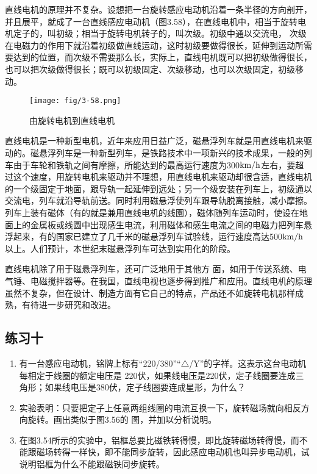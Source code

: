 直线电机的原理并不复杂。设想把一台旋转感应电动机沿着一条半径的方向剖开，并且展平，就成了一台直线感应电动机（图3.58），在直线电机中，相当于旋转电机定子的，叫初级；相当于旋转电机转子的，叫次级。初级中通以交流电，
次级在电磁力的作用下就沿着初级做直线运动，这时初级要做得很长，延伸到运动所需要达到的位置，而次级不需要那么长，实际上，直线电机既可以把初级做得很长，也可以把次级做得很长；既可以初级固定、次级移动，也可以次级固定，初级移动。
\begin{figure}[htp]\centering
\texttt{[image: fig/3-58.png]}
\caption{由旋转电机到直线电机}
\end{figure}

直线电机是一种新型电机，近年来应用日益广泛，磁悬浮列车就是用直线电机来驱动的。磁悬浮列车是一种新型列车，是铁路技术中一项新兴的技术成果，一般的列车由于车轮和铁轨之间有摩擦，所能达到的最高运行速度为300$\text{km}/\text{h}$左右，要超过这个速度，用旋转电机来驱动并不理想，用直线电机来驱动却很含适，直线电机的一个级固定于地面，跟导轨一起延伸到远处；另一个级安装在列车上，初级通以交流电，列车就沿导轨前送。同时利用磁悬浮使列车跟导轨脱离接触，减小摩擦。列车上装有磁体（有的就是兼用直线电机的线園），磁体随列车运动时，使设在地面上的金属板或线圆中出现感生电流，利用磁体和感生电流之间的电磁力把列车悬浮起来，有的国家已建立了几千米的磁悬浮列车试验线，运行速度高达500$\text{km}/\text{h}$以上。人们预计，本世纪末磁悬浮列车可达到实用化的阶段。

直线电机除了用于磁悬浮列车，还可广泛地用于其他方
面，如用于传送系统、电气锤、电磁搅拌器等。在我国，直线电视也逐步得到推广和应用。直线电机的原理虽然不复杂，但在设计、制造方面有它自己的特点，产品还不如旋转电机那样成熟，有待进一步研究和改进。

\subsection*{练习十}
\begin{enumerate}
    \item 有一台感应电动机，铭牌上标有“220/380”“$\triangle$/Y”的字祥。这表示这台电动机每相定于线圈的额定电压是 220伏，如果线电压是220伏，定子线圈要连成三角形；如果线电压是380伏，定子线圈要连成星形，为什么？
    \item 实验表明：只要把定子上任意两组线圈的电流互换一下，旋转磁场就向相反方向旋转。画出类似于图3.56的
    图，并加以分析说明。
    \item 在图3.54所示的实验中，铝框总要比磁铁转得慢，即比旋转磁场转得慢，而不能跟磁场转得一样快，即不能同步旋转，因此感应电动机也叫异步电动机，试说明铝框为什么不能跟磁铁同步旋转。
\end{enumerate}


